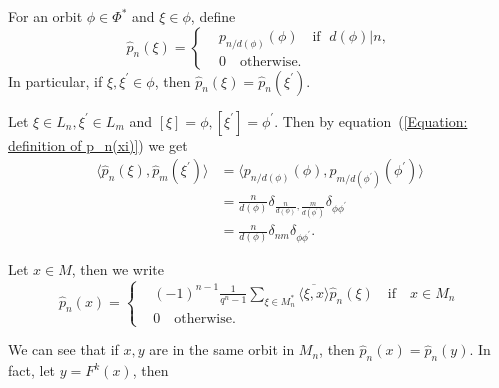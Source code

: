 \begin{dang}
    \begin{definition}\cite{jing2024characters}\label{Definition: p hat xi}
        For an orbit $\phi\in\Phi^*$ and $\xi\in\phi$, define
        \begin{equation}\label{Equation: definition of p_n(xi)}
           \hat{p}_n(\xi)= \left\{\begin{aligned}
                &p_{n/d(\phi)}(\phi)\quad\text{if }\;d(\phi)|n,\\
                &0\quad\text{otherwise}.
            \end{aligned}\right.
        \end{equation}
        In particular, if $\xi,\xi^\prime\in\phi$, then $\hat{p}_n(\xi)=\hat{p}_n(\xi^\prime)$.
    \end{definition}
\end{dang}
Let $\xi\in L_n,\xi^\prime\in L_m$ and $[\xi]=\phi, [\xi^\prime]=\phi^\prime$. Then by equation~(\ref{Equation: definition of p_n(xi)}) we get
\begin{equation}
\begin{split}
      \langle \hat{p}_n(\xi),\hat{p}_m(\xi^\prime)\rangle & = \langle p_{n/d(\phi)}(\phi), p_{m/d(\phi^\prime)}(\phi^\prime) \rangle\\
      &=\frac{n}{d(\phi)}\delta_{\frac{n}{d(\phi)},\frac{m}{d(\phi^\prime)}}\delta_{\phi\phi^\prime}\\
      &=\frac{n}{d(\phi)}\delta_{nm}\delta_{\phi\phi^\prime}.
\end{split}
\end{equation}
\begin{dang}
    \begin{definition}\cite{jing2024characters}\label{Definition: p hat x}
        Let $x\in M$, then we write
        \begin{equation}\label{Equation: pn(x)}
            \hat{p}_n(x)=\left\{\begin{aligned}
                &(-1)^{n-1}\frac{1}{q^n-1}\sum_{\xi\in M_n^*}\overline{\langle\xi,x\rangle}\hat{p}_n(\xi)\quad\text{if}\quad x\in M_n\\
                &0\quad\text{otherwise}.
            \end{aligned}\right.
        \end{equation}
    \end{definition}
\end{dang}
We can see that if $x, y$ are in the same orbit in $M_n$, then $\hat{p}_n(x)=\hat{p}_n(y)$. In fact, let $y=F^k(x)$, then
